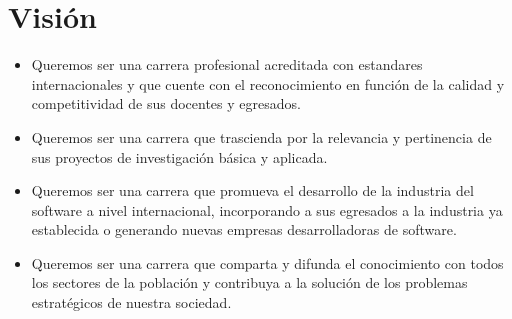 \section{Visión}\label{sec:cs-vision}

\begin{itemize}
\item Queremos ser una carrera profesional acreditada con estandares internacionales y que cuente con el reconocimiento en función de la calidad y competitividad de sus docentes y egresados.

\item Queremos ser una carrera que trascienda por la relevancia y pertinencia de sus proyectos de investigación básica y aplicada.

\item Queremos ser una carrera que promueva el desarrollo de la industria del software a nivel internacional, incorporando a sus egresados a la industria ya establecida o generando nuevas empresas desarrolladoras de software.

\item Queremos ser una carrera que comparta y difunda el conocimiento con todos los sectores de la población y contribuya a la solución de los problemas estratégicos de nuestra sociedad.
\end{itemize}
